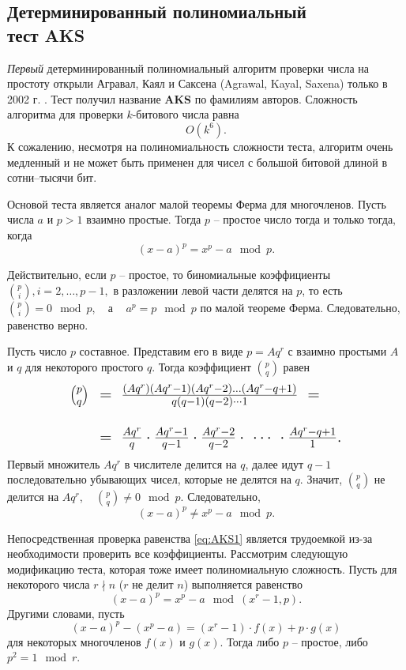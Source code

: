\subsection[Детерминированный тест AKS]{Детерминированный полиномиальный \protect\\ тест AKS}

\emph{Первый} детерминированный полиномиальный алгоритм проверки числа на простоту открыли Агравал, Каял и Саксена (Agrawal, Kayal, Saxena) только в 2002 г. . Тест получил название \textbf{AKS} по фамилиям авторов. Сложность алгоритма для проверки $k$-битового числа равна
    \[ O(k^{6}). \]
К сожалению, несмотря на полиномиальность сложности теста, алгоритм очень медленный и не может быть применен для чисел с большой битовой длиной в сотни--тысячи бит.

Основой теста является аналог малой теоремы Ферма для многочленов. Пусть числа $a$ и $p > 1$  взаимно простые. Тогда $p$ -- простое число тогда и только тогда, когда
\begin{equation}
    \label{eq:AKS1}
    (x - a)^p = x^p - a \mod p.
\end{equation}

Действительно, если $p$ -- простое, то биномиальные коэффициенты $\binom{p}{i}, i = 2,  \dots,  p-1,$ в разложении левой части делятся на $p$, то есть ~ $\binom{p}{i} = 0 \mod p$, ~ а ~ $a^p = p \mod p$ по малой теореме Ферма. Следовательно, равенство верно.

Пусть число $p$  составное. Представим его в виде $p = A q^r$ с взаимно простыми $A$ и $q$ для некоторого простого $q$. Тогда коэффициент $\binom{p}{q}$ равен
\[\Large \begin{array}{rl}
    \binom{p}{q} & =~ \frac{(A q^r) (A q^r - 1)(A q^r - 2) \dots (A q^r - q + 1)}{q (q-1)(q-2) \cdots 1} ~= \\
    & \\
    & =~ \frac{A q^r}{q} \cdot \frac{A q^r - 1}{q-1} \cdot \frac{A q^r - 2}{q-2} \cdot ~\cdots~ \cdot \frac{A q^r - q + 1}{1}. \\
\end{array} \]
Первый множитель $A q^r$ в числителе делится на $q$, далее идут $q-1$ последовательно убывающих чисел, которые не делятся на $q$. Значит, $\binom{p}{q}$ не делится на $A q^r$, ~ $\binom{p}{q} \neq 0 \mod p$. Следовательно,
\[
(x - a)^p \neq x^p - a \mod p.
\]

Непосредственная проверка равенства \eqref{eq:AKS1} является  трудоемкой  из-за необходимости проверить все коэффициенты. Рассмотрим следующую модификацию теста, которая тоже имеет полиномиальную сложность. Пусть для некоторого числа $r \nmid n$ ($r$ не делит $n$) выполняется равенство
\begin{equation}
    \label{eq:AKS2}
    (x - a)^p = x^p - a \mod (x^r-1, p).
\end{equation}
Другими словами, пусть
    \[ (x - a)^p - (x^p - a) = (x^r-1) \cdot f(x) + p \cdot g(x) \]
для некоторых многочленов $f(x)$ и $g(x)$. Тогда либо $p$ -- простое, либо $p^2 = 1 \mod r$.

